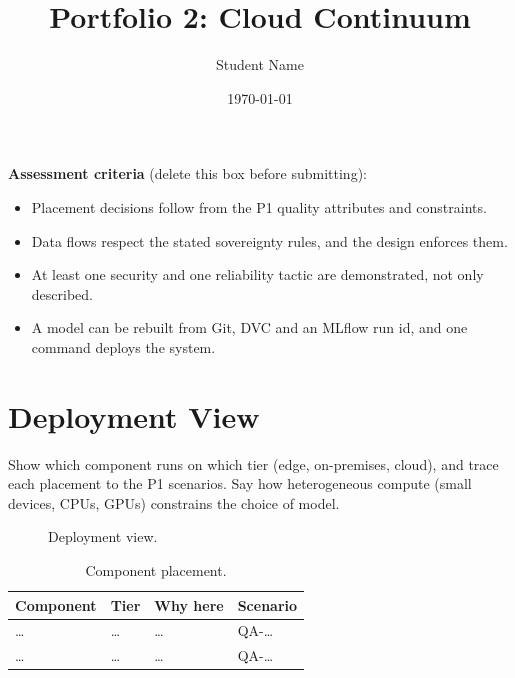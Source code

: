 \documentclass[report]{itvest}
\title{Portfolio 2: Cloud Continuum}
\author{Student Name} %
\date{\today}
\begin{document}
\maketitle

\begin{checkit}
  \textbf{Assessment criteria} (delete this box before submitting):
  \begin{itemize}
    \item Placement decisions follow from the P1 quality attributes and
      constraints.
    \item Data flows respect the stated sovereignty rules, and the design
      enforces them.
    \item At least one security and one reliability tactic are
      demonstrated, not only described.
    \item A model can be rebuilt from Git, DVC and an MLflow run id, and
      one command deploys the system.
  \end{itemize}
\end{checkit}

\section{Deployment View}

Show which component runs on which tier (edge, on-premises, cloud), and
trace each placement to the P1 scenarios. Say how heterogeneous compute
(small devices, CPUs, GPUs) constrains the choice of model.

\begin{figure}[h]
  \centering
  \caption{Deployment view.}
  \label{fig:deployment}
\end{figure}

\begin{table}[h]
  \centering
  \begin{tabularx}{\textwidth}{llXl}
    \toprule
    Component & Tier & Why here & Scenario \\
    \midrule
    \ldots & \ldots & \ldots & QA-\ldots \\
    \ldots & \ldots & \ldots & QA-\ldots \\
    \bottomrule
  \end{tabularx}
  \caption{Component placement.}
  \label{tab:placement}
\end{table}
\end{document}
